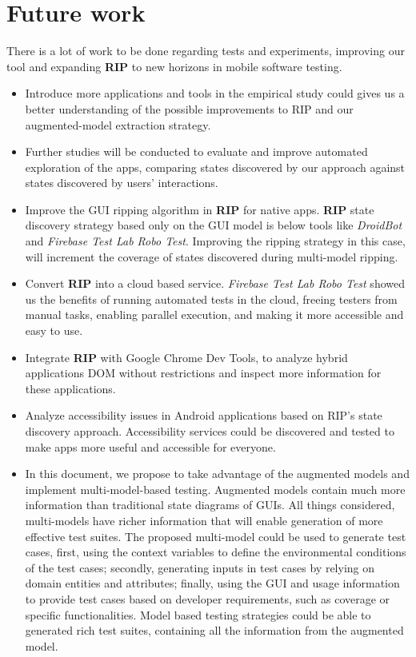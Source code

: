 \section{Future work}

There is a lot of work to be done regarding tests and experiments, improving our tool and expanding \textbf{RIP} to new horizons in mobile software testing.

\begin{itemize}
	\item Introduce more applications and tools in the empirical study could gives us a better understanding of the possible improvements to RIP and our augmented-model extraction strategy.
	
	\item Further studies will be conducted to evaluate and improve automated exploration of the apps, comparing states discovered by our approach against states discovered by users' interactions.
	
	\item Improve the GUI ripping algorithm in \textbf{RIP} for native apps. \textbf{RIP} state discovery strategy based only on the GUI model is below tools like \textit{DroidBot} and \textit{Firebase Test Lab Robo Test}. Improving the ripping strategy in this case, will increment the coverage of states discovered during multi-model ripping.
	
	\item Convert \textbf{RIP} into a cloud based service. \textit{Firebase Test Lab Robo Test} showed us the benefits of running automated tests in the cloud, freeing testers from manual tasks, enabling parallel execution, and making it more accessible and easy to use.
	
	\item Integrate \textbf{RIP} with Google Chrome Dev Tools, to analyze hybrid applications DOM without restrictions and inspect more information for these applications.
	
	\item Analyze accessibility issues in Android applications based on RIP's state discovery approach. Accessibility services could be discovered and tested to make apps more useful and accessible for everyone.
	
	\item In this document, we propose to take advantage of the augmented models and implement multi-model-based testing. Augmented models contain much more information than traditional state diagrams of GUIs. All things considered, multi-models have richer information that will enable generation of more effective test suites. The proposed multi-model could be used to generate test cases, first, using the context variables to define the environmental conditions of the test cases; secondly, generating  inputs in test cases by relying on domain entities and attributes; finally, using the GUI and usage information to provide test cases based on developer requirements, such as coverage or specific functionalities. Model based testing strategies could be able to generated rich test suites, containing all the information from the augmented model. 
	
\end{itemize}


